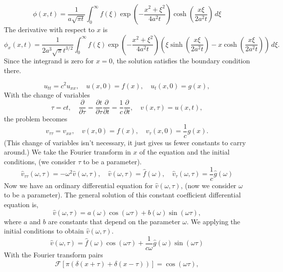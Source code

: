 {\begin{Solution}
\begin{enumerate}
\[    \boxed{
      \phi(x,t) = \frac{1}{a \sqrt{\pi t} } \int_0^{\infty}
      f(\xi) \exp\left( - \frac{x^2 + \xi^2}{4 a^2 t} \right) 
      \cosh \left( \frac{x \xi}{2 a^2 t} \right) \,d\xi
      }
    \]
    The derivative with respect to $x$ is
    \[
    \phi_x(x,t) = \frac{1}{2 a^3 \sqrt{\pi} t^{3/2} } \int_0^{\infty}
    f(\xi) \exp\left( - \frac{x^2 + \xi^2}{4 a^2 t} \right) 
    \left( \xi \sinh \left( \frac{x \xi}{2 a^2 t} \right)
      - x \cosh \left( \frac{x \xi}{2 a^2 t} \right) \right) \,d\xi.
    \]
    Since the integrand is zero for $x = 0$, the solution
    satisfies the boundary condition there.
  \end{enumerate}
\end{Solution}






\begin{Solution}
  \[
  u_{t t} = c^2 u_{x x}, \quad u(x,0) = f(x), \quad u_t(x,0) = g(x),
  \]
  With the change of variables
  \[
  \tau = c t, \quad 
  \frac{\partial}{\partial \tau} = \frac{\partial t}{\partial \tau} \frac{\partial}{\partial t} = \frac{1}{c} \frac{\partial}{\partial t},
  \quad v(x,\tau) = u(x,t),
  \]
  the problem becomes
  \[
  v_{\tau\tau} =  v_{x x}, 
  \quad v(x,0) = f(x), 
  \quad v_\tau(x,0) = \frac{1}{c} g(x).
  \]
  (This change of variables isn't necessary, it just gives us fewer 
  constants to carry around.)
  We take the Fourier transform in $x$ of the equation and the initial 
  conditions, (we consider $\tau$ to be a parameter).
  \[
  \hat{v}_{\tau\tau}(\omega,\tau) = -\omega^2 \hat{v}(\omega,\tau), \quad
  \hat{v}(\omega,\tau) = \hat{f}(\omega), \quad
  \hat{v}_\tau(\omega,\tau) = \frac{1}{c} \hat{g}(\omega)
  \]
  Now we have an ordinary differential equation for $\hat{v}(\omega,\tau)$, 
  (now we consider $\omega$ to be a parameter).  The general solution of this 
  constant coefficient differential equation is,
  \[
  \hat{v}(\omega,\tau) = a(\omega) \cos(\omega \tau) + b(\omega) \sin(\omega \tau),
  \]
  where $a$ and $b$ are constants that depend on the parameter $\omega$.
  We applying the initial conditions to obtain $\hat{v}(\omega,\tau)$.
  \[
  \hat{v}(\omega,\tau) = \hat{f}(\omega) \cos(\omega \tau) 
  + \frac{1}{c \omega} \hat{g}(\omega) \sin(\omega \tau)
  \]
  With the Fourier transform pairs
  \begin{gather*}
    \mathcal{F}[\pi ( \delta(x+\tau) + \delta(x-\tau))] = \cos(\omega \tau), 

\end{gather*}
\end{Solution}}
